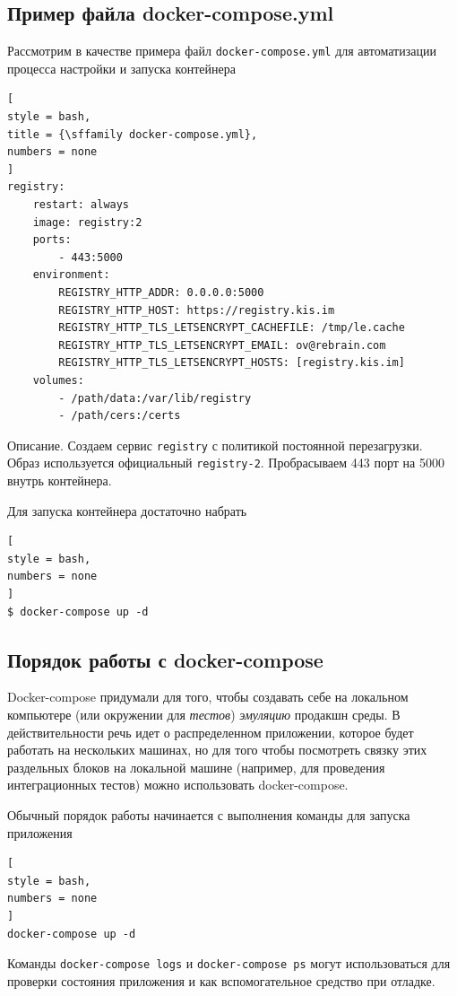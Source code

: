 \documentclass[%
	11pt,
	a4paper,
	utf8,
		]{article}
\begin{document}
\subsection{Пример файла docker-compose.yml}

Рассмотрим в качестве примера файл \texttt{docker-compose.yml} для автоматизации процесса настройки и запуска контейнера
\begin{lstlisting}[
style = bash,
title = {\sffamily docker-compose.yml},
numbers = none
]
registry:
    restart: always
    image: registry:2
    ports:
        - 443:5000
    environment:
        REGISTRY_HTTP_ADDR: 0.0.0.0:5000
        REGISTRY_HTTP_HOST: https://registry.kis.im
        REGISTRY_HTTP_TLS_LETSENCRYPT_CACHEFILE: /tmp/le.cache
        REGISTRY_HTTP_TLS_LETSENCRYPT_EMAIL: ov@rebrain.com
        REGISTRY_HTTP_TLS_LETSENCRYPT_HOSTS: [registry.kis.im]
    volumes:
        - /path/data:/var/lib/registry
        - /path/cers:/certs
\end{lstlisting}

Описание. Создаем сервис \texttt{registry} с политикой постоянной перезагрузки. Образ используется официальный \texttt{registry-2}. Пробрасываем 443 порт на 5000 внутрь контейнера.

Для запуска контейнера достаточно набрать
\begin{lstlisting}[
style = bash,
numbers = none
]
$ docker-compose up -d
\end{lstlisting}

\subsection{Порядок работы с docker-compose}

Docker-compose придумали для того, чтобы создавать себе на локальном компьютере (или окружении для \emph{тестов}) \emph{эмуляцию} продакшн среды. В действительности речь идет о распределенном приложении, которое будет работать на нескольких машинах, но для того чтобы посмотреть связку этих раздельных блоков на локальной машине (например, для проведения интеграционных тестов) можно использовать docker-compose.

Обычный порядок работы начинается с выполнения команды для запуска приложения
\begin{lstlisting}[
style = bash,
numbers = none
]
docker-compose up -d
\end{lstlisting}

Команды \texttt{docker-compose logs} и \texttt{docker-compose ps} могут использоваться для проверки состояния приложения и как вспомогательное средство при отладке.
\end{document}
